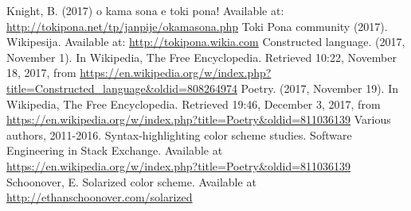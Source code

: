 \documentclass{article}
\begin{document}
\begin{thebibliography}{99}
  Knight, B. (2017) o kama sona e toki pona! Available at:
    \url{http://tokipona.net/tp/janpije/okamasona.php}
  Toki Pona community (2017). Wikipesija. Available at:
    \url{http://tokipona.wikia.com}
  Constructed language. (2017, November 1). In Wikipedia, The Free Encyclopedia. Retrieved 10:22, November 18, 2017, from \url{https://en.wikipedia.org/w/index.php?title=Constructed_language&oldid=808264974}
Poetry. (2017, November 19). In Wikipedia, The Free Encyclopedia.
    Retrieved 19:46, December 3, 2017, from
    \url{https://en.wikipedia.org/w/index.php?title=Poetry&oldid=811036139}
  Various authors, 2011-2016. Syntax-highlighting color scheme studies.
    Software Engineering in Stack Exchange. Available at
    \url{https://en.wikipedia.org/w/index.php?title=Poetry&oldid=811036139}
  Schoonover, E. Solarized color scheme. Available at
  \url{http://ethanschoonover.com/solarized}
\end{thebibliography}
\end{document}
